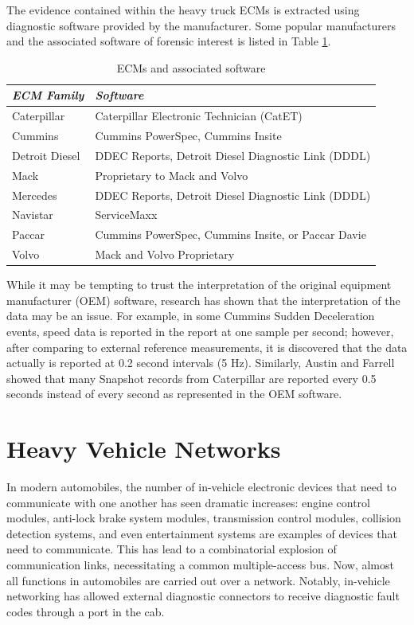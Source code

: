 The evidence contained within the heavy truck ECMs is extracted using diagnostic software provided by the manufacturer. Some popular
manufacturers and the associated software of forensic interest is listed in Table \ref{tab:software}.

\begin{table}
\centering
\begin{tabular}{|l|l|}
\hline
\emph{ECM Family} & \emph{Software}\\
\hline
Caterpillar & Caterpillar Electronic Technician (CatET)\\
\hline
Cummins & Cummins PowerSpec, Cummins Insite\\
\hline
Detroit Diesel & DDEC Reports, Detroit Diesel Diagnostic Link (DDDL)\\
\hline
Mack & Proprietary to Mack and Volvo\\
\hline
Mercedes & DDEC Reports, Detroit Diesel Diagnostic Link (DDDL)\\
\hline
Navistar & ServiceMaxx \\
\hline
Paccar & Cummins PowerSpec, Cummins Insite, or Paccar Davie\\
\hline
Volvo & Mack and Volvo Proprietary\\
\hline
\end{tabular}
\caption{ECMs and associated software}
\label{tab:software}
\end{table}
While it may be tempting to trust the interpretation of the original equipment manufacturer (OEM) software, research has shown 
that the interpretation of the data may be an issue. For example, in some Cummins Sudden Deceleration 
events, speed data is reported in the report at one sample per second; however, after comparing to 
external reference measurements, it is discovered that the data actually is reported at 0.2 second 
intervals (5 Hz)\cite{bortolin2009}. Similarly, Austin and Farrell \cite{austin2011} showed that many Snapshot records 
from Caterpillar are reported every 0.5 seconds instead of every second as represented in the OEM software.

\section{Heavy Vehicle Networks}

In modern automobiles, the number of in-vehicle electronic devices that need to communicate with one another has seen dramatic increases:
engine control modules, anti-lock brake system modules, transmission control modules, collision detection systems, and even entertainment systems are examples of
devices that need to communicate. This has lead to a combinatorial explosion of communication links, necessitating a common multiple-access
bus. Now, almost all functions in automobiles are carried out over a network. Notably, in-vehicle networking has allowed external diagnostic
connectors to receive diagnostic fault codes through a port in the cab.

